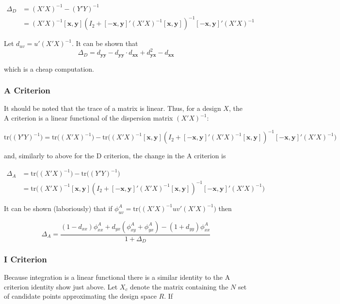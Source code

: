 \documentclass{article}\usepackage[]{graphicx}\usepackage[]{color}
\begin{document}
\begin{align*}
  \Delta_D &= (X'X)^{-1} - (Y'Y)^{-1} \\
  &= (X'X)^{-1}[\textbf{x}, \textbf{y}] (I_2 + [-\textbf{x},\textbf{y}]' (X'X)^{-1} [\textbf{x},\textbf{y}] )^{-1} [-\textbf{x},\textbf{y}]' (X'X)^{-1}
\end{align*}

Let $d_{uv} = u' (X'X)^{-1}$. It can be shown that
$$ \Delta_D = d_{\textbf{yy}} - d_{\textbf{yy}} \cdot d_{\textbf{xx}} + d_{\textbf{yx}}^2 - d_{\textbf{xx}} $$

which is a cheap computation.

\subsubsection{A Criterion}
It should be noted that the trace of a matrix is linear. Thus, for a design $X$, the A criterion is a linear functional of the dispersion matrix $(X'X)^{-1}$:

$$ \mbox{tr}\big( (Y'Y)^{-1}\big) = \mbox{tr} \big( (X'X)^{-1} \big) - \mbox{tr} \big( (X'X)^{-1}[\textbf{x}, \textbf{y}] (I_2 + [-\textbf{x},\textbf{y}]' (X'X)^{-1} [\textbf{x},\textbf{y}] )^{-1} [-\textbf{x},\textbf{y}]' (X'X)^{-1} \big) $$

and, similarly to above for the D criterion, the change in the A criterion is

\begin{align*}
  \Delta_A &= \mbox{tr} \big( (X'X)^{-1} \big) - \mbox{tr}\big( (Y'Y)^{-1}\big)\\
  &= \mbox{tr} \big( (X'X)^{-1}[\textbf{x}, \textbf{y}] (I_2 + [-\textbf{x},\textbf{y}]' (X'X)^{-1} [\textbf{x},\textbf{y}] )^{-1} [-\textbf{x},\textbf{y}]' (X'X)^{-1} \big)
\end{align*}

It can be shown (laboriously) that if $\phi^A_{uv} = \mbox{tr} \big( (X'X)^{-1} u v' (X'X)^{-1} \big)$ then

$$ \Delta_A = \frac{(1 - d_{xx}) \phi^A_{xx} + d_{yx} (\phi^A_{xy} + \phi^A_{yx}) - (1 + d_{yy})\phi^A_{xx}}{1 + \Delta_D} $$

\subsubsection{ I Criterion}
Because integration is a linear functional there is a similar identity to the A criterion identity show just above. Let $X_c$ denote the matrix containing the $N$ set of candidate points approximating the design space $R$. If 
\end{document}
